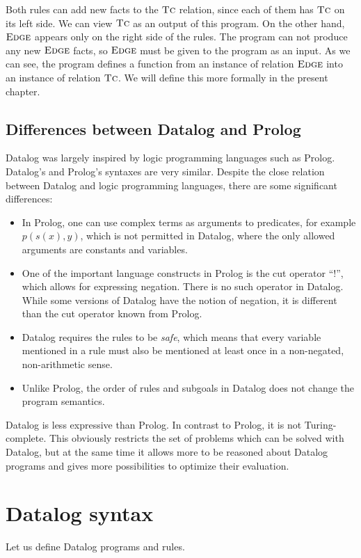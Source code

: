 Both rules can add new facts to the $\textsc{Tc}$ relation, since each of them has $\textsc{Tc}$ on its left side. We can view $\textsc{Tc}$ as an output of this program. On the other hand, $\textsc{Edge}$ appears only on the right side of the rules. The program can not produce any new $\textsc{Edge}$ facts, so $\textsc{Edge}$ must be given to the program as an input. As we can see, the program defines a function from an instance of relation $\textsc{Edge}$ into an instance of relation $\textsc{Tc}$. We will define this more formally in the present chapter.

\subsection{Differences between Datalog and Prolog}
Datalog was largely inspired by logic programming languages such as Prolog. Datalog's and Prolog's syntaxes are very similar.
Despite the close relation between Datalog and logic programming languages, there are some significant differences:

\begin{itemize}
\item In Prolog, one can use complex terms as arguments to predicates, for example $p(s(x), y)$, which is not permitted in Datalog, where the only allowed arguments are constants and variables.
\item One of the important language constructs in Prolog is the cut operator ``!'', which allows for expressing negation. There is no such operator in Datalog. While some versions of Datalog have the notion of negation, it is different than the cut operator known from Prolog.
\item Datalog requires the rules to be \emph{safe}, which means that every variable mentioned in a rule must also be mentioned at least once in a non-negated, non-arithmetic sense.
\item Unlike Prolog, the order of rules and subgoals in Datalog does not change the program semantics.
\end{itemize}

Datalog is less expressive than Prolog. In contrast to Prolog, it is not Turing-complete. This obviously restricts the set of problems which can be solved with Datalog, but at the same time it allows more to be reasoned about Datalog programs and gives more possibilities to optimize their evaluation.

\section{Datalog syntax}
Let us define Datalog programs and rules.

